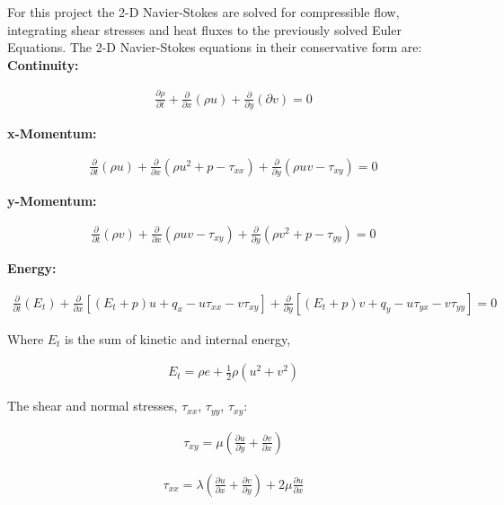 \documentclass[10pt,a4paper]{article}
\begin{document}
For this project the 2-D Navier-Stokes are solved for compressible flow, integrating shear stresses and heat fluxes to the previously solved Euler Equations. The 2-D Navier-Stokes equations in their conservative form are:\\



\textbf{Continuity:}

\begin{align*}
\frac{\partial \rho}{\partial t} + \frac{\partial}{\partial x}(\rho u) + \frac{\partial }{\partial y} (\partial v) = 0
\end{align*}

\textbf{x-Momentum:}

\begin{align*}
\frac{\partial}{\partial t}(\rho u) + \frac{\partial}{\partial x} (\rho u^2 + p - \tau_{xx}) + \frac{\partial}{\partial y} (\rho u v - \tau_{xy}) = 0
\end{align*}

\textbf{y-Momentum:}

\begin{align*}
\frac{\partial}{\partial t}(\rho v) + \frac{\partial}{\partial x} (\rho u v - \tau_{xy}) + \frac{\partial}{\partial y} (\rho  v^2 + p - \tau_{yy}) = 0
\end{align*}


\textbf{Energy:}

\begin{align*}
\frac{\partial}{\partial t}(E_t) + \frac{\partial }{\partial x}[(E_t + p) u + q_x - u \tau_{xx} - v \tau_{xy}] + \frac{\partial}{\partial y}[(E_t + p)v + q_y - u \tau_{yx} - v \tau_{yy}] = 0
\end{align*}


Where $E_t$ is the sum of kinetic and internal energy,

\begin{align*}
E_t = \rho e + \frac{1}{2} \rho ( u^2 + v^2)
\end{align*}


The shear and normal stresses, $\tau_{xx}$, $\tau_{yy}$, $\tau_{xy}$:

\begin{align*}
\tau_{xy} = \mu \left( \frac{\partial u}{\partial y} + \frac{\partial v}{\partial x} \right)
\end{align*}

\begin{align*}
\tau_{xx} = \lambda \left( \frac{\partial u}{\partial x} + \frac{\partial v}{\partial y} \right) + 2 \mu \frac{\partial u}{\partial x}
\end{align*}
\end{document}
